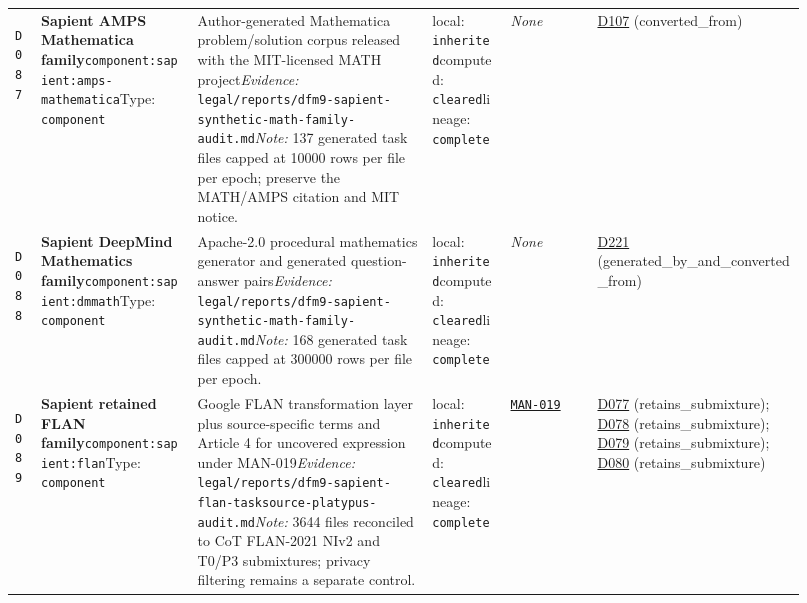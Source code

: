 \documentclass[9pt,a4paper]{article}
\newcommand{\depid}[1]{\hypertarget{dep:#1}{\texttt{#1}}}
\begin{document}
\begin{landscape}
\begin{longtable}{@{}L{0.035\linewidth}L{0.185\linewidth}L{0.27\linewidth}L{0.09\linewidth}L{0.10\linewidth}L{0.24\linewidth}@{}}
\depid{D087} & \textbf{Sapient AMPS Mathematica family}\newline \nolinkurl{component:sapient:amps-mathematica}\newline Type: \texttt{component} & Author-generated Mathematica problem/solution corpus released with the MIT-licensed MATH project\newline \textit{Evidence:} \nolinkurl{legal/reports/dfm9-sapient-synthetic-math-family-audit.md}\newline \textit{Note:} 137 generated task files capped at 10000 rows per file per epoch; preserve the MATH/AMPS citation and MIT notice. & local: \texttt{inherited}\newline computed: \texttt{cleared}\newline lineage: \texttt{complete} & \textit{None} & \hyperlink{dep:D107}{D107} (converted\_from) \\
\depid{D088} & \textbf{Sapient DeepMind Mathematics family}\newline \nolinkurl{component:sapient:dmmath}\newline Type: \texttt{component} & Apache-2.0 procedural mathematics generator and generated question-answer pairs\newline \textit{Evidence:} \nolinkurl{legal/reports/dfm9-sapient-synthetic-math-family-audit.md}\newline \textit{Note:} 168 generated task files capped at 300000 rows per file per epoch. & local: \texttt{inherited}\newline computed: \texttt{cleared}\newline lineage: \texttt{complete} & \textit{None} & \hyperlink{dep:D221}{D221} (generated\_by\_and\_converted\_from) \\
\depid{D089} & \textbf{Sapient retained FLAN family}\newline \nolinkurl{component:sapient:flan}\newline Type: \texttt{component} & Google FLAN transformation layer plus source-specific terms and Article 4 for uncovered expression under MAN-019\newline \textit{Evidence:} \nolinkurl{legal/reports/dfm9-sapient-flan-tasksource-platypus-audit.md}\newline \textit{Note:} 3644 files reconciled to CoT FLAN-2021 NIv2 and T0/P3 submixtures; privacy filtering remains a separate control. & local: \texttt{inherited}\newline computed: \texttt{cleared}\newline lineage: \texttt{complete} & \hyperlink{manual:MAN-019}{\texttt{MAN-019}} & \hyperlink{dep:D077}{D077} (retains\_submixture); \hyperlink{dep:D078}{D078} (retains\_submixture); \hyperlink{dep:D079}{D079} (retains\_submixture); \hyperlink{dep:D080}{D080} (retains\_submixture) \\

\end{longtable}
\end{landscape}
\end{document}
